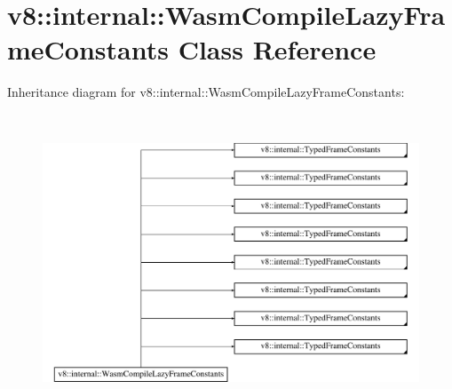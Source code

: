 \hypertarget{classv8_1_1internal_1_1WasmCompileLazyFrameConstants}{}\section{v8\+:\+:internal\+:\+:Wasm\+Compile\+Lazy\+Frame\+Constants Class Reference}
\label{classv8_1_1internal_1_1WasmCompileLazyFrameConstants}
Inheritance diagram for v8\+:\+:internal\+:\+:Wasm\+Compile\+Lazy\+Frame\+Constants\+:\begin{figure}[H]
\begin{center}
\leavevmode
\includegraphics[height=8.873240cm]{classv8_1_1internal_1_1WasmCompileLazyFrameConstants}
\end{center}
\end{figure}
